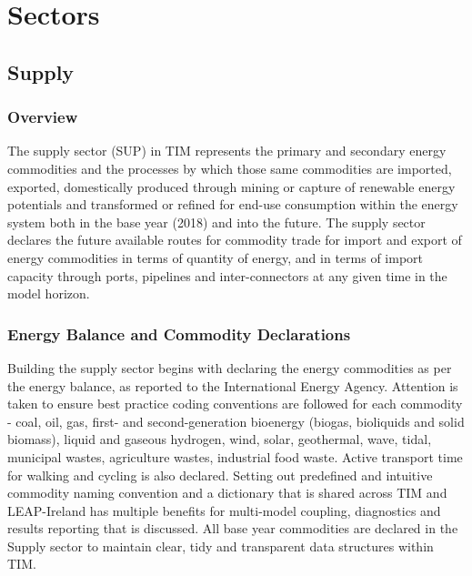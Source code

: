 \documentclass[gmd,manuscript]{copernicus}
\begin{document}

\section{Sectors}
\label{s:sectors}

\subsection{Supply}
\label{ss:supply}
\subsubsection{Overview}
The supply sector (SUP) in TIM represents the primary and secondary energy commodities and the processes by which those same commodities are imported, exported, domestically produced through mining or capture of renewable energy potentials and transformed or refined for end-use consumption within the energy system both in the base year (2018) and into the future. The supply sector declares the future available routes for commodity trade for import and export of energy commodities in terms of quantity of energy, and in terms of import capacity through ports, pipelines and inter-connectors at any given time in the model horizon. 

\subsubsection{Energy Balance and Commodity Declarations}
Building the supply sector begins with declaring the energy commodities as per the \citet{SEAI2019} energy balance, as reported to the International Energy Agency. Attention is taken to ensure best practice coding conventions are followed for each commodity - coal, oil, gas, first- and second-generation bioenergy (biogas, bioliquids and solid biomass), liquid and gaseous hydrogen, wind, solar, geothermal, wave, tidal, municipal wastes, agriculture wastes, industrial food waste. Active transport time for walking and cycling is also declared. Setting out predefined and intuitive commodity naming convention and a dictionary that is shared across TIM and LEAP-Ireland has multiple benefits for multi-model coupling, diagnostics and results reporting that is discussed. All base year commodities are declared in the Supply sector to maintain clear, tidy and transparent data structures within TIM.
\end{document}
